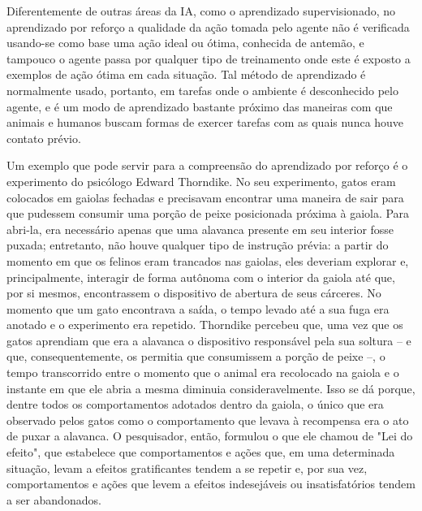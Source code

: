 \documentclass[cic,tc]{iiufrgs}
\begin{document}
Diferentemente de outras áreas da IA, como o aprendizado supervisionado, no aprendizado por reforço a qualidade da ação tomada pelo agente não
é verificada usando-se como base uma ação ideal ou ótima,  conhecida de antemão, e tampouco o agente passa por qualquer tipo de treinamento onde este é exposto a
exemplos de ação ótima em cada situação. Tal método de aprendizado é normalmente usado, portanto, em tarefas onde o ambiente é desconhecido
pelo agente, e é um modo de aprendizado bastante próximo das maneiras com que
animais e humanos buscam formas de exercer tarefas com as quais nunca houve contato prévio. \par
Um exemplo que pode servir para a compreensão do aprendizado por reforço é o experimento do psicólogo Edward Thorndike.
No seu experimento, gatos eram colocados em gaiolas fechadas e precisavam encontrar uma maneira de sair para que pudessem
consumir uma porção de peixe posicionada próxima à gaiola. Para abri-la, era necessário apenas que uma alavanca presente em
seu interior fosse puxada; entretanto, não houve qualquer tipo de instrução prévia: a partir do momento em que os felinos
eram trancados nas gaiolas, eles deveriam explorar e, principalmente, interagir de forma autônoma com o interior da gaiola até que, por si mesmos,
encontrassem o dispositivo de abertura de seus cárceres. No momento que um gato encontrava a saída, o tempo levado até a sua fuga era anotado
 e o experimento era repetido.
Thorndike percebeu que, uma vez que os gatos aprendiam que era a alavanca o dispositivo responsável pela sua
soltura – e que, consequentemente, os permitia que consumissem a porção de peixe –, o tempo transcorrido entre o momento
que o animal era recolocado na gaiola e o instante em que ele abria a mesma diminuia consideravelmente. Isso se dá porque,
dentre todos os comportamentos adotados dentro da gaiola, o único que era observado pelos gatos como o comportamento que
levava à recompensa era o ato de puxar a alavanca. O pesquisador, então, formulou o que ele chamou de "Lei do efeito",
que estabelece que comportamentos e ações que, em uma determinada situação, levam a efeitos gratificantes tendem a se
repetir e, por sua vez, comportamentos e ações que levem a efeitos indesejáveis ou insatisfatórios tendem a ser abandonados.

\end{document}

